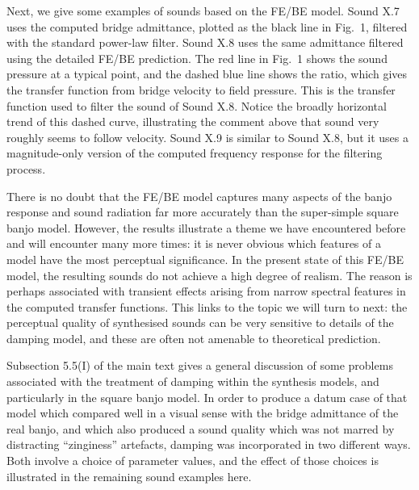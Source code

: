 \audio{}

\audio{}

\audio{}

\audio{}

\audio{}

\audio{}

  Next, we give some examples of sounds based on the FE/BE model. Sound X.7 
  uses the computed bridge admittance, plotted as the black line in Fig.\ 1, 
  filtered with the standard power-law filter. Sound X.8 uses the same 
  admittance filtered using the detailed FE/BE prediction. The red line in 
  Fig.\ 1 shows the sound pressure at a typical point, and the dashed blue line 
  shows the ratio, which gives the transfer function from bridge velocity to 
  field pressure. This is the transfer function used to filter the sound of 
  Sound X.8. Notice the broadly horizontal trend of this dashed curve, 
  illustrating the comment above that sound very roughly seems to follow 
  velocity. Sound X.9 is similar to Sound X.8, but it uses a magnitude-only 
  version of the computed frequency response for the filtering process. 


\audio{}

\audio{}

\audio{}

  There is no doubt that the FE/BE model captures many aspects of the banjo 
  response and sound radiation far more accurately than the super-simple square 
  banjo model. However, the results illustrate a theme we have encountered 
  before and will encounter many more times: it is never obvious which features 
  of a model have the most perceptual significance. In the present state of 
  this FE/BE model, the resulting sounds do not achieve a high degree of 
  realism. The reason is perhaps associated with transient effects arising from 
  narrow spectral features in the computed transfer functions. This links to 
  the topic we will turn to next: the perceptual quality of synthesised sounds 
  can be very sensitive to details of the damping model, and these are often 
  not amenable to theoretical prediction. 

  Subsection 5.5(I) of the main text gives a general discussion of some 
  problems associated with the treatment of damping within the synthesis 
  models, and particularly in the square banjo model. In order to produce a 
  datum case of that model which compared well in a visual sense with the 
  bridge admittance of the real banjo, and which also produced a sound quality 
  which was not marred by distracting ``zinginess'' artefacts, damping was 
  incorporated in two different ways. Both involve a choice of parameter 
  values, and the effect of those choices is illustrated in the remaining sound 
  examples here. 

